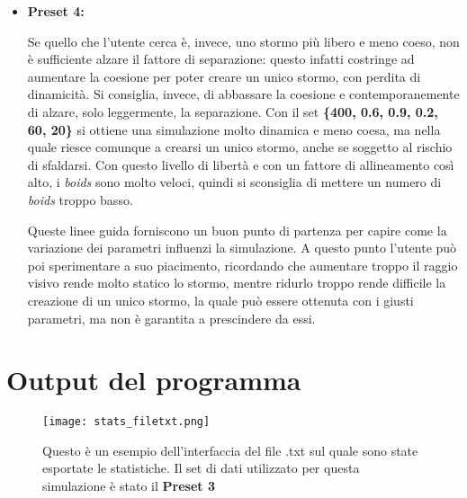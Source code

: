 \documentclass{article}
\begin{document}
\begin{itemize}
\item \large\textbf{Preset 4:} \normalsize

Se quello che l'utente cerca è, invece, uno stormo più libero e meno coeso, non 
è sufficiente alzare il fattore di separazione: questo infatti costringe ad 
aumentare la coesione per poter creare un unico stormo, con perdita di 
dinamicità. Si consiglia, invece, di abbassare la coesione e contemporanemente 
di alzare, solo leggermente, la separazione. Con il set \textbf{\{400, 0.6, 0.9, 
0.2, 60, 20\}} si ottiene una simulazione molto dinamica e meno coesa, ma nella 
quale riesce comunque a crearsi un unico stormo, anche se soggetto al rischio di
 sfaldarsi. Con questo livello di libertà e con un fattore di allineamento così 
 alto, i \textit{boids} sono molto veloci, quindi si sconsiglia di mettere un 
 numero di \textit{boids} troppo basso. 

\medskip
Queste linee guida forniscono un buon punto di partenza per capire come la 
variazione dei parametri influenzi la simulazione. A questo punto l'utente può 
poi sperimentare a suo piacimento, ricordando che aumentare troppo il raggio 
visivo rende molto statico lo stormo, mentre ridurlo troppo rende difficile la 
creazione di un unico stormo, la quale può essere ottenuta con i giusti 
parametri, ma non è garantita a prescindere da essi. 

\end{itemize} 


\section{Output del programma}
\begin{figure}[h]
\centering
\texttt{[image: stats\_filetxt.png]}
\caption{\label{fig:stats_file}}Questo è un esempio dell'interfaccia del file 
.txt sul quale sono state esportate le statistiche. Il set di dati utilizzato 
per questa simulazione è stato il \textbf{Preset 3}
\end{figure} 
\end{document}
